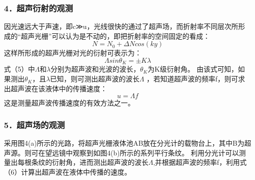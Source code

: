 \documentclass[12pt,a4paper,UTF8]{ctexart}
\begin{document}
\subsubsection*{4．超声衍射的观测}
因光速远大于声速，即c≫u，光线很快的通过了超声场，而折射率不同层次所形成的“超声光栅”可以认为是不动的，即把折射率的空间固定的看成：
\begin{equation}
	N=N_0+\varDelta N cos(ky)
\end{equation}
这样所形成的超声光栅对光的衍射可表示为：
\begin{equation}
	\varLambda sin \theta_K = \pm K\lambda
\end{equation}
式（5）中$\varLambda $和$\lambda$分别为超声波和光波的波长，$\theta_K $为K级衍射角。
由该式可知，如果测出$\theta_K$，且$\lambda$已知，则可测出超声波的波长$\varLambda$ ，若知道超声波的频率f，则可求出超声波在该液体中的传播速度：
\begin{equation}
	u=\varLambda f
\end{equation}
这是测量超声波传播速度的有效方法之一。

\subsubsection*{5．超声场的观测}
采用图4(a)所示的光路，将超声光栅液体池AB放在分光计的载物台上，其中B为超声源。则可在望远镜中观察到如图4(b)所示的系列平行条纹。
利用分光计可以测量出每根条纹的衍射角，进而测出超声波的波长$\varLambda $,并根据超声波的频率f，利用式（6）计算出超声波在液体中传播的速度。

\begin{figure}[htbp]
	\centering
	\caption{}
	\label{fig:tcvi}
\end{figure}
\end{document}
